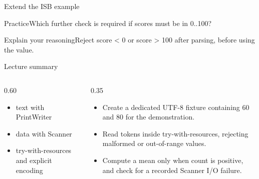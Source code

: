 \documentclass[10pt,aspectratio=169]{beamer}
\begin{document}
\begin{frame}[fragile,t]{Extend the ISB example}
\begin{alertblock}{Practice}Which further check is required if scores must be in 0..100?\end{alertblock}\vspace{3mm}\begin{exampleblock}{Explain your reasoning}Reject score \textless{} 0 or score \textgreater{} 100 after parsing, before using the value.\end{exampleblock}
\end{frame}
\begin{frame}[fragile,t]{Lecture summary}
\begin{columns}[T,onlytextwidth]\begin{column}{0.60\textwidth}
\begin{itemize}
\item text with PrintWriter
\item data with Scanner
\item try-with-resources and explicit encoding
\end{itemize}
\end{column}\begin{column}{0.35\textwidth}\small
\begin{itemize}
\item Create a dedicated UTF-8 fixture containing 60 and 80 for the demonstration.
\item Read tokens inside try-with-resources, rejecting malformed or out-of-range values.
\item Compute a mean only when count is positive, and check for a recorded Scanner I/O failure.
\end{itemize}
\end{column}\end{columns}
\end{frame}
\end{document}
